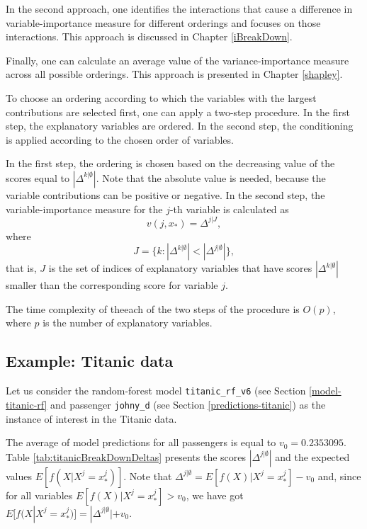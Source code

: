 \documentclass[12pt,]{krantz}
\begin{document}
In the second approach, one identifies the interactions that cause a difference in variable-importance measure for different orderings and focuses on those interactions. This approach is discussed in Chapter \ref{iBreakDown}.

Finally, one can calculate an average value of the variance-importance measure across all possible orderings. This approach is presented in Chapter \ref{shapley}.

To choose an ordering according to which the variables with the largest contributions are selected first, one can apply a two-step procedure. In the first step, the explanatory variables are ordered. In the second step, the conditioning is applied according to the chosen order of variables.

In the first step, the ordering is chosen based on the decreasing value of the scores equal to \(|\Delta^{k|\emptyset}|\). Note that the absolute value is needed, because the variable contributions can be positive or negative. In the second step, the variable-importance measure for the \(j\)-th variable is calculated as
\[
v(j, x_*) = \Delta ^{j|J},
\]
where
\[
J = \{k: |\Delta^{k|\emptyset}| < |\Delta^{j|\emptyset}|\},
\]
that is, \(J\) is the set of indices of explanatory variables that have scores \(|\Delta^{k|\emptyset}|\) smaller than the corresponding score for variable \(j\).

The time complexity of theeach of the two steps of the procedure is \(O(p)\), where \(p\) is the number of explanatory variables.

\hypertarget{BDExample}{%
\subsection{Example: Titanic data}\label{BDExample}}

Let us consider the random-forest model \texttt{titanic\_rf\_v6} (see Section \ref{model-titanic-rf} and passenger \texttt{johny\_d} (see Section \ref{predictions-titanic}) as the instance of interest in the Titanic data.

The average of model predictions for all passengers is equal to \(v_0 = 0.2353095\). Table \ref{tab:titanicBreakDownDeltas} presents the scores \(|\Delta^{j|\emptyset}|\) and the expected values \(E[f(X | X^j = x^j_*)]\). Note that \(\Delta^{j|\emptyset}=E[f(X) | X^j = x^j_*]-v_0\) and, since for all variables \(E[f(X) | X^j = x^j_*]>v_0\), we have got \(E[f(X | X^j = x^j_*)]=|\Delta^{j|\emptyset}|+v_0\).
\end{document}
